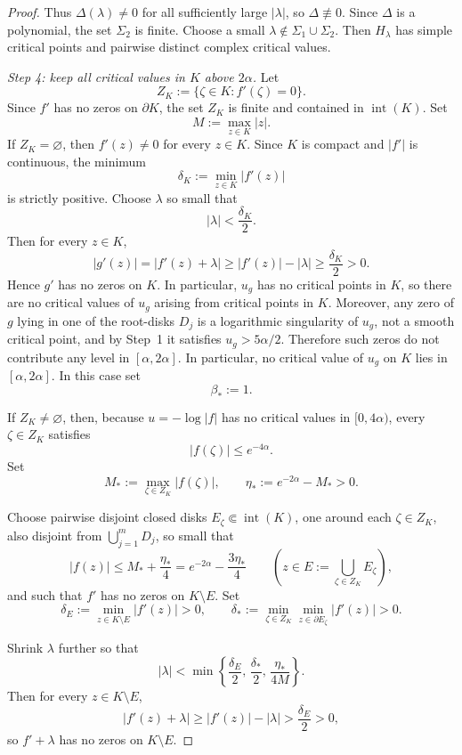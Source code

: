 \documentclass[12pt]{amsart}
\theoremstyle{definition}
\theoremstyle{remark}
\begin{document}
\begin{proof}
\indent Thus $\Delta(\lambda)\neq 0$ for all sufficiently large $|\lambda|$, so $\Delta\not\equiv 0$. Since $\Delta$ is a polynomial, the set $\Sigma_2$
is finite. Choose a small $\lambda\notin \Sigma_1\cup\Sigma_2$. Then $H_\lambda$ has simple critical points and pairwise distinct
complex critical values.

\noindent\textit{Step 4: keep all critical values in $K$ above $2\alpha$.} Let
\[
 Z_K:=\{\zeta\in K:f'(\zeta)=0\}.
\]
Since $f'$ has no zeros on $\partial K$, the set $Z_K$ is finite and contained in $\operatorname{int}(K)$.
Set
\[
M:=\max_{z\in K}|z|.
\]
If $Z_K=\varnothing$, then $f'(z)\neq 0$ for every $z\in K$. Since $K$ is compact and
$|f'|$ is continuous, the minimum
\[
\delta_K:=\min_{z\in K}|f'(z)|
\]
is strictly positive. Choose $\lambda$ so small that
\[
|\lambda|<\frac{\delta_K}{2}.
\]
Then for every $z\in K$,
\[
|g'(z)|=|f'(z)+\lambda|\ge |f'(z)|-|\lambda|\ge \frac{\delta_K}{2}>0.
\]
Hence $g'$ has no zeros on $K$. In particular, $u_g$ has no critical points in $K$,
so there are no critical values of $u_g$ arising from critical points in $K$. Moreover, any
zero of $g$ lying in one of the root-disks $D_j$ is a logarithmic singularity of $u_g$, not a
smooth critical point, and by Step~1 it satisfies $u_g>5\alpha/2$. Therefore such zeros do not
contribute any level in $[\alpha,2\alpha]$. In particular, no critical value of $u_g$ on $K$
lies in $[\alpha,2\alpha]$. In this case set
\[
\beta_*:=1.
\]

If $Z_K\neq\varnothing$, then, because $u=-\log|f|$ has no critical values in $[0,4\alpha)$, every $\zeta\in Z_K$ satisfies
\[
 |f(\zeta)|\le e^{-4\alpha}.
\]
Set
\[
M_*:=\max_{\zeta\in Z_K}|f(\zeta)|,\qquad \eta_*:=e^{-2\alpha}-M_*>0.
\]

Choose pairwise disjoint closed disks $E_\zeta\Subset \operatorname{int}(K)$, one around each
$\zeta\in Z_K$, also disjoint from $\bigcup_{j=1}^m D_j$, so small that
\[
|f(z)|\le M_*+\frac{\eta_*}{4}=e^{-2\alpha}-\frac{3\eta_*}{4}
\qquad
\left(z\in E:=\bigcup_{\zeta\in Z_K}E_\zeta\right),
\]
and such that $f'$ has no zeros on $K\setminus E$. Set
\[
\delta_E:=\min_{z\in K\setminus E}|f'(z)|>0,
\qquad
\delta_*:=\min_{\zeta\in Z_K}\min_{z\in \partial E_\zeta}|f'(z)|>0.
\]

Shrink $\lambda$ further so that
\[
|\lambda|<\min\left\{\frac{\delta_E}{2},\,\frac{\delta_*}{2},\,\frac{\eta_*}{4M}\right\}.
\]
Then for every $z\in K\setminus E$,
\[
|f'(z)+\lambda|\ge |f'(z)|-|\lambda|>\frac{\delta_E}{2}>0,
\]
so $f'+\lambda$ has no zeros on $K\setminus E$.


\end{proof}
\end{document}
